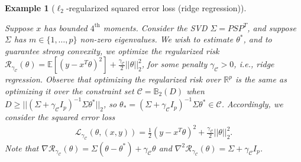 \documentclass{article}
\newtheorem{example}{Example}
\begin{document}
\begin{example} [$\ell_2$-regularized squared error loss (ridge regression)]
\label{sec:LR_l2_Reg}

Suppose $x$ has bounded $4^{\text{th}}$ moments. Consider the SVD $\Sigma = PSP^T$, and suppose
$\Sigma$ has $m \in \{1, \dots, p\}$ non-zero eigenvalues. 
We wish to estimate $\theta^*$, and to guarantee strong convexity, we optimize the regularized risk $\mathcal{R}_{\gamma_{\mathcal{C}}}(\theta) = \mathbb{E}[(y - x^T\theta)^2] + \frac{\gamma_{\mathcal{C}}}{2}||\theta||_2^2$, for some penalty $\gamma_{\mathcal{C}} > 0$, i.e., ridge regression. Observe that optimizing the regularized risk over $\mathbb{R}^p$ is the same as optimizing it over the constraint set $\mathcal{C} = \mathbb{B}_2(D)$ when $D \geq ||(\Sigma + \gamma_{\mathcal{C}} I_p)^{-1}\Sigma\theta^*||_2$, so $\theta_* = (\Sigma + \gamma_{\mathcal{C}}I_p)^{-1}\Sigma\theta^* \in \mathcal{C}$. Accordingly, we consider the squared error loss
\begin{align*}
\mathcal{L}_{\gamma_{\mathcal{C}}}(\theta, (x, y)) = \frac{1}{2}(y - x^T\theta)^2 + \frac{\gamma_{\mathcal{C}}}{2}||\theta||_2^2.
\end{align*}
Note that $\nabla \mathcal{R}_{\gamma_{\mathcal{C}}}(\theta) = \Sigma(\theta - \theta^*) + \gamma_{\mathcal{C}}\theta$ and $
\nabla^2 \mathcal{R}_{\gamma_{\mathcal{C}}}(\theta) = \Sigma + \gamma_{\mathcal{C}}I_p$.

\end{example}
\end{document}
